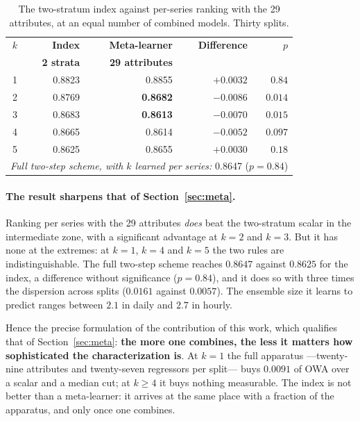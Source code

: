 \begin{table}[htbp]
\centering
\caption{The two-stratum index against per-series ranking with the 29 attributes, at an
equal number of combined models. Thirty splits.}
\label{tab:dospasos}
\begin{tabular}{crrrr}
\toprule
$k$ & \textbf{Index} & \textbf{Meta-learner} & \textbf{Difference} & \textbf{$p$} \\
  & \textbf{2 strata} & \textbf{29 attributes} & & \\
\midrule
1 & 0.8823 & 0.8855 & $+0.0032$ & $0.84$ \\
2 & 0.8769 & \textbf{0.8682} & $-0.0086$ & $0.014$ \\
3 & 0.8683 & \textbf{0.8613} & $-0.0070$ & $0.015$ \\
4 & 0.8665 & 0.8614 & $-0.0052$ & $0.097$ \\
5 & 0.8625 & 0.8655 & $+0.0030$ & $0.18$ \\
\midrule
\multicolumn{5}{l}{\emph{Full two-step scheme, with $k$ learned per series:}
  0.8647 \quad ($p=0.84$)} \\
\bottomrule
\end{tabular}
\end{table}

\paragraph{The result sharpens that of Section~\ref{sec:meta}.} Ranking per series with
the 29 attributes \emph{does} beat the two-stratum scalar in the intermediate zone, with a
significant advantage at $k=2$ and $k=3$. But it has none at the extremes: at $k=1$, $k=4$
and $k=5$ the two rules are indistinguishable. The full two-step scheme reaches $0.8647$
against $0.8625$ for the index, a difference without significance ($p=0.84$), and it does
so with three times the dispersion across splits ($0.0161$ against $0.0057$). The ensemble
size it learns to predict ranges between $2.1$ in daily and $2.7$ in hourly.

Hence the precise formulation of the contribution of this work, which qualifies that of
Section~\ref{sec:meta}: \textbf{the more one combines, the less it matters how
sophisticated the characterization is}. At $k=1$ the full apparatus ---twenty-nine
attributes and twenty-seven regressors per split--- buys $0.0091$ of OWA over a scalar and
a median cut; at $k\ge4$ it buys nothing measurable. The index is not better than a
meta-learner: it arrives at the same place with a fraction of the apparatus, and only once
one combines.

